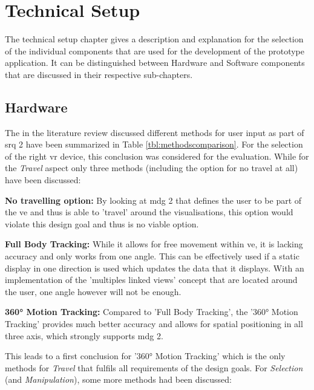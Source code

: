 
\section{Technical Setup}

The technical setup chapter gives a description and explanation for the selection of the individual components that are used for the development of the prototype application. It can be distinguished between Hardware and Software components that are discussed in their respective sub-chapters.


\subsection{Hardware}

The in the literature review discussed different methods for user input as part of \gls{srq} 2 have been summarized in Table \ref{tbl:methodscomparison}. For the selection of the right \gls{vr} device, this conclusion was considered for the evaluation. While for the \textit{Travel} aspect only three methods (including the option for no travel at all) have been discussed:

\textbf{No travelling option:}
By looking at \gls{mdg} 2 that defines the user to be part of the \gls{ve} and thus is able to 'travel' around the visualisations, this option would violate this design goal and thus is no viable option.

\textbf{Full Body Tracking:}
While it allows for free movement within \gls{ve}, it is lacking accuracy and only works from one angle. This can be effectively used if a static display in one direction is used which updates the data that it displays. With an implementation of the 'multiples linked views' concept that are located around the user, one angle however will not be enough.

\textbf{360° Motion Tracking:}
Compared to 'Full Body Tracking', the '360° Motion Tracking' provides much better accuracy and allows for spatial positioning in all three axis, which strongly supports \gls{mdg} 2.


This leads to a first conclusion for '360° Motion Tracking' which is the only methods for \textit{Travel} that fulfils all requirements of the design goals. \newline
For \textit{Selection} (and \textit{Manipulation}), some more methods had been discussed:

